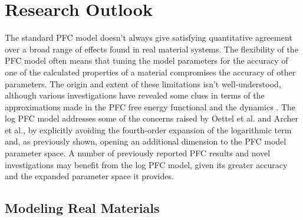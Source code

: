 \section{Research Outlook}
\label{chap:ourModel}

The standard PFC model doesn't always give satisfying quantitative agreement over a broad range of effects found in real material systems.  The flexibility of the PFC model often means that tuning the model parameters for the accuracy of one of the calculated properties of a material compromises the accuracy of other parameters.  The origin and extent of these limitations isn't well-understood, although various investigations have revealed some clues in terms of the approximations made in the PFC free energy functional \cite{oettel2012description-318, archer2019Deriving, wu2007phasefield-f49, wu2010phasefieldcrystal-7c4} and the dynamics \cite{burns2022timescale-edb}.  The log PFC model addresses some of the concerns raised by Oettel et al. and Archer et al., by explicitly avoiding the fourth-order expansion of the logarithmic term and, as previously shown, opening an additional dimension to the PFC model parameter space.  A number of previously reported PFC results and novel investigations may benefit from the log PFC model, given its greater accuracy and the expanded parameter space it provides.

\subsection{Modeling Real Materials}

